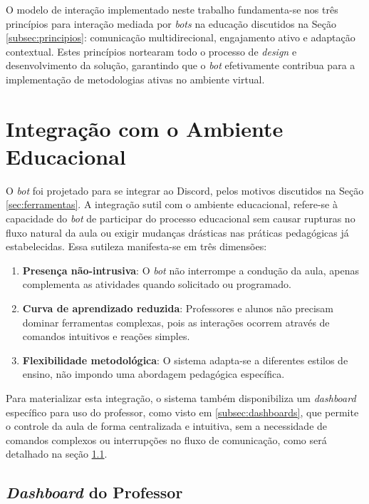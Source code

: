 O modelo de interação implementado neste trabalho fundamenta-se nos três
princípios para interação mediada por \textit{bots} na educação discutidos na
Seção \ref{subsec:principios}: comunicação multidirecional, engajamento ativo e
adaptação contextual. Estes princípios nortearam todo o processo de
\textit{design} e desenvolvimento da solução, garantindo que o \textit{bot}
efetivamente contribua para a implementação de metodologias ativas no ambiente
virtual.

\section{Integração com o Ambiente Educacional}
\label{sec:integracao}

O \textit{bot} foi projetado para se integrar ao Discord, pelos motivos
discutidos na Seção \ref{sec:ferramentas}. A integração sutil com o ambiente
educacional, refere-se à capacidade do \textit{bot} de participar do processo
educacional sem causar rupturas no fluxo natural da aula ou exigir mudanças
drásticas nas práticas pedagógicas já estabelecidas. Essa sutileza manifesta-se
em três dimensões:

\begin{enumerate}
\item \textbf{Presença não-intrusiva}: O \textit{bot} não interrompe a condução
da aula, apenas complementa as atividades quando solicitado ou programado.
\item \textbf{Curva de aprendizado reduzida}: Professores e alunos não precisam
dominar ferramentas complexas, pois as interações ocorrem através de comandos
intuitivos e reações simples.
\item \textbf{Flexibilidade metodológica}: O sistema adapta-se a diferentes
estilos de ensino, não impondo uma abordagem pedagógica específica.
\end{enumerate}

Para materializar esta integração, o sistema também disponibiliza um
\textit{dashboard} específico para uso do professor, como visto em
\ref{subsec:dashboards}, que permite o controle da aula de forma centralizada e
intuitiva, sem a necessidade de comandos complexos ou interrupções no fluxo de
comunicação, como será detalhado na seção \ref{subsec:dashboard}.

\subsection{\textit{Dashboard} do Professor}
\label{subsec:dashboard}

